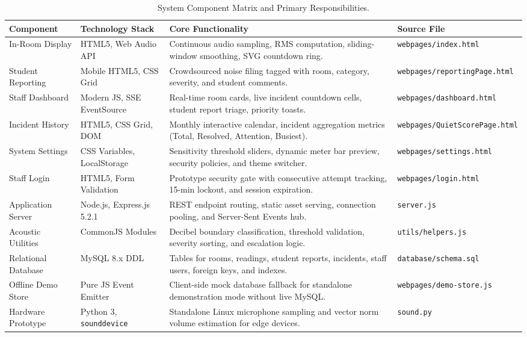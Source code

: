 \documentclass[11pt,a4paper]{article}
\begin{document}
\begin{table}[H]
\centering
\small
\begin{tabularx}{\textwidth}{l p{3.2cm} X l}
\toprule
\textbf{Component} & \textbf{Technology Stack} & \textbf{Core Functionality} & \textbf{Source File} \\
\midrule
In-Room Display & HTML5, Web Audio API & Continuous audio sampling, RMS computation, sliding-window smoothing, SVG countdown ring. & \texttt{webpages/index.html} \\
Student Reporting & Mobile HTML5, CSS Grid & Crowdsourced noise filing tagged with room, category, severity, and student comments. & \texttt{webpages/reportingPage.html} \\
Staff Dashboard & Modern JS, SSE EventSource & Real-time room cards, live incident countdown cells, student report triage, priority toasts. & \texttt{webpages/dashboard.html} \\
Incident History & HTML5, CSS Grid, DOM & Monthly interactive calendar, incident aggregation metrics (Total, Resolved, Attention, Busiest). & \texttt{webpages/QuietScorePage.html} \\
System Settings & CSS Variables, LocalStorage & Sensitivity threshold sliders, dynamic meter bar preview, security policies, and theme switcher. & \texttt{webpages/settings.html} \\
Staff Login & HTML5, Form Validation & Prototype security gate with consecutive attempt tracking, 15-min lockout, and session expiration. & \texttt{webpages/login.html} \\
Application Server & Node.js, Express.js 5.2.1 & REST endpoint routing, static asset serving, connection pooling, and Server-Sent Events hub. & \texttt{server.js} \\
Acoustic Utilities & CommonJS Modules & Decibel boundary classification, threshold validation, severity sorting, and escalation logic. & \texttt{utils/helpers.js} \\
Relational Database & MySQL 8.x DDL & Tables for rooms, readings, student reports, incidents, staff users, foreign keys, and indexes. & \texttt{database/schema.sql} \\
Offline Demo Store & Pure JS Event Emitter & Client-side mock database fallback for standalone demonstration mode without live MySQL. & \texttt{webpages/demo-store.js} \\
Hardware Prototype & Python 3, \texttt{sounddevice} & Standalone Linux microphone sampling and vector norm volume estimation for edge devices. & \texttt{sound.py} \\
\bottomrule
\end{tabularx}
\caption{System Component Matrix and Primary Responsibilities.}
\label{tab:components}
\end{table}
\end{document}
